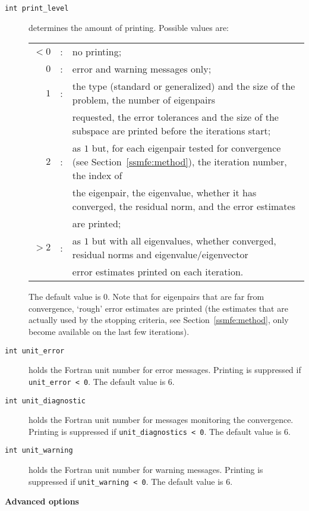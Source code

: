 \begin{description}
%
\item[\texttt{int print\_level}]
determines the amount of printing.
Possible values are:\\
%
\begin{tabular}{rcl}
$<0$ &:& no printing;\\
$0$ &:& error and warning messages only;\\
$1$ &:& the type (standard or generalized) and the size of the problem,
the number of eigenpairs \\ 
& & requested, the error tolerances and
the size of the subspace are printed before the iterations start;\\
$2$ &:& as $1$ but, for each eigenpair tested for convergence
(see Section~\ref{ssmfe:method}), the iteration number,
the index of \\
& & 
the eigenpair, the
eigenvalue, whether it has converged, the residual norm, and the error
estimates \\
& & are printed;\\
$>2$ &:& as $1$ but with all eigenvalues, whether converged, residual norms
and eigenvalue/eigenvector\\ 
& & error estimates printed on each iteration. 
\end{tabular}

\noindent
The default value is 0. 
Note that for eigenpairs that are far from convergence,
`rough' error estimates are printed
(the estimates that are actually used by the stopping criteria,
see Section~\ref{ssmfe:method}, only become available on the last few
iterations).
%
\item[\texttt{int unit\_error}]
holds the Fortran unit number for error messages.
Printing is suppressed if {\tt unit\_error < 0}.
The default value is 6. 
%
\item[\texttt{int unit\_diagnostic}]
holds the Fortran unit number for messages monitoring the convergence.
Printing is suppressed if {\tt unit\_diagnostics < 0}.
The default value is 6. 
%
\item[\texttt{int unit\_warning}]
holds the Fortran unit number for warning messages.
Printing is suppressed if {\tt unit\_warning < 0}.
The default value is 6. 
%
\end{description}

\medskip
\noindent
{\bf Advanced options}

